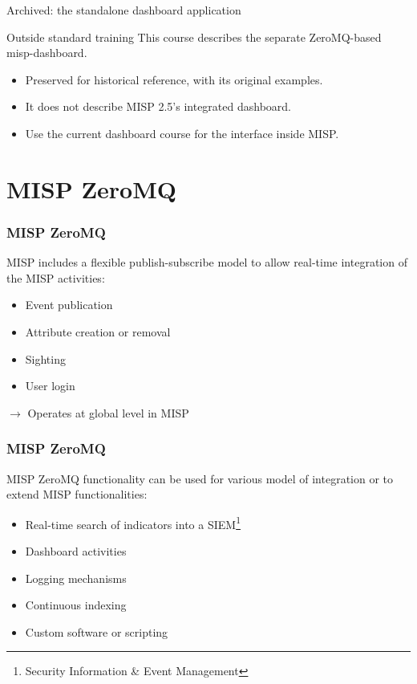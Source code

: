 
\begin{frame}[t,plain]
\titlepage
\end{frame}

\begin{frame}{Archived: the standalone dashboard application}
    \begin{alertblock}{Outside standard training}
        This course describes the separate ZeroMQ-based misp-dashboard.
    \end{alertblock}
    \begin{itemize}
        \item Preserved for historical reference, with its original examples.
        \item It does not describe MISP 2.5's integrated dashboard.
        \item Use the current dashboard course for the interface inside MISP.
    \end{itemize}
\end{frame}


\section{MISP ZeroMQ}
\begin{frame}
\frametitle{MISP ZeroMQ}
    MISP includes a flexible publish-subscribe model to allow real-time integration of the MISP activities:
    \begin{itemize}
        \item Event publication
        \item Attribute creation or removal
        \item Sighting
        \item User login
    \end{itemize}
    \begin{center}
        $\rightarrow$ Operates at global level in MISP
    \end{center}
\end{frame}

\begin{frame}
    \frametitle{MISP ZeroMQ}
MISP ZeroMQ functionality can be used for various model of integration or to extend MISP functionalities:
    \begin{itemize}
        \item Real-time search of indicators into a SIEM\footnote{Security Information \& Event Management}
        \item Dashboard activities
        \item Logging mechanisms
        \item Continuous indexing
        \item Custom software or scripting
    \end{itemize}
\end{frame}

